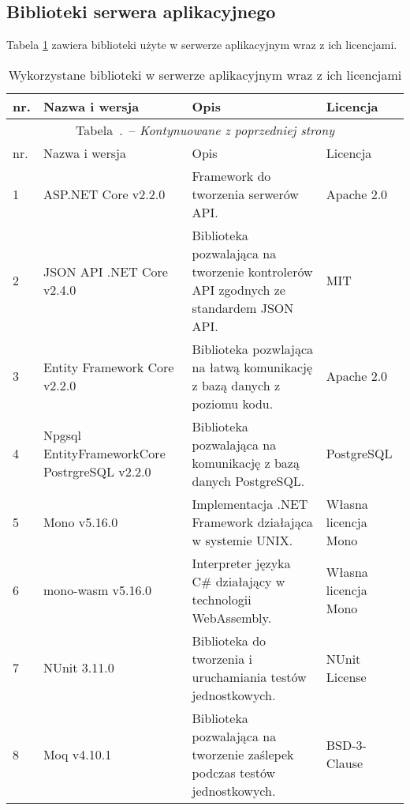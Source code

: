 \documentclass[a4paper,11pt,twoside]{report}
\renewcommand{\tablename}{Tabela}
\renewcommand*{\thetable}{\arabic{chapter}.\arabic{table}}
\theoremstyle{definition}
\begin{document}
        \subsection{Biblioteki serwera aplikacyjnego}
        Tabela \ref{biblioteki-serwer} zawiera biblioteki użyte w serwerze aplikacyjnym wraz z ich licencjami.
        
        \begin{center}
        	\begin{longtable}{| p{} | p{} | p{} | p{} |}
        		\caption{Wykorzystane biblioteki w serwerze aplikacyjnym wraz z ich licencjami}
        		\label{biblioteki-serwer} \\
        		\hline
        		nr. & Nazwa i wersja & Opis & Licencja \\ \hline
        		\endfirsthead
        		\multicolumn{4}{c}{\tablename\ \thetable\ -- \textit{Kontynuowane z poprzedniej strony}} \\
        		\hline
        		nr. & Nazwa i wersja & Opis & Licencja \\ \hline
        		\endhead
        		
        		1 & ASP.NET Core v2.2.0 & Framework do tworzenia serwerów API. & Apache 2.0 \\ \hline
        		2 & JSON API .NET Core v2.4.0 & Biblioteka pozwalająca na tworzenie kontrolerów API zgodnych ze standardem JSON API. & MIT \\ \hline
        		3 & Entity Framework Core v2.2.0 & Biblioteka pozwlająca na łatwą komunikację z bazą danych z poziomu kodu. & Apache 2.0 \\ \hline
        		4 & Npgsql EntityFrameworkCore PostrgreSQL v2.2.0 & Biblioteka pozwalająca na komunikację z bazą danych PostgreSQL. & PostgreSQL \cite{licencja-postgresql} \\ \hline
        		5 & Mono v5.16.0 & Implementacja .NET Framework działająca w systemie UNIX. & Własna licencja Mono \cite{licencja-mono} \\ \hline
        		6 & mono-wasm v5.16.0 & Interpreter języka C\# działający w technologii WebAssembly. & Własna licencja Mono \cite{licencja-mono} \\ \hline
        		7 & NUnit 3.11.0 & Biblioteka do tworzenia i uruchamiania testów jednostkowych. & NUnit License \cite{licencja-nunit} \\ \hline
        		8 & Moq v4.10.1 & Biblioteka pozwalająca na tworzenie zaślepek podczas testów jednostkowych. & BSD-3-Clause \\ \hline
        	\end{longtable}
        \end{center}
        
\end{document}
